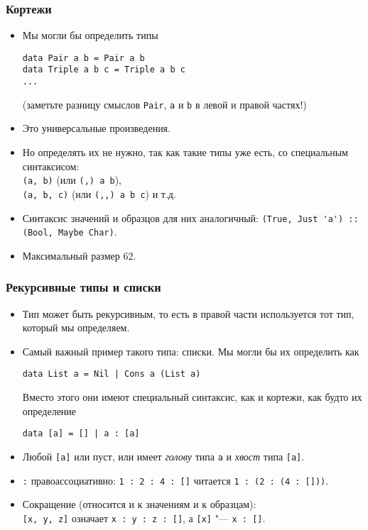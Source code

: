 \documentclass[10pt]{beamer}
\begin{document}
\begin{frame}[fragile]
  \frametitle{Кортежи}
  \begin{itemize}
    \item Мы могли бы определить типы
          \begin{lstlisting}
data Pair a b = Pair a b
data Triple a b c = Triple a b c
...
\end{lstlisting}
          (заметьте разницу смыслов \lstinline|Pair|, \lstinline|a| и \lstinline|b| в левой и правой частях!)
    \item Это универсальные произведения.
          \pause
    \item Но определять их не нужно, так как такие типы уже есть, со специальным синтаксисом:\\
          \lstinline|(a, b)| (или \lstinline|(,) a b|),\\ \lstinline|(a, b, c)| (или \lstinline|(,,) a b c|) и т.д.
    \item Синтаксис значений и образцов для них аналогичный:
          \lstinline|(True, Just 'a') :: |\pause\lstinline|(Bool, Maybe Char)|.
    \item Максимальный размер 62.
  \end{itemize}
\end{frame}

\begin{frame}[fragile]
  \frametitle{Рекурсивные типы и списки}
  \begin{itemize}
    \item Тип может быть рекурсивным, то есть в правой части используется тот тип, который мы определяем.
    \item Самый важный пример такого типа: списки.
          Мы могли бы их определить как
          \begin{lstlisting}
data List a = Nil | Cons a (List a)
\end{lstlisting}
          Вместо этого они имеют специальный синтаксис, как и кортежи, как будто их определение
          \begin{lstlisting}
data [a] = [] | a : [a]
\end{lstlisting}
    \item Любой \lstinline|[a]| или пуст, или имеет \emph{голову} типа \lstinline|a| и \emph{хвост} типа \lstinline|[a]|.
    \item \lstinline|:| правоассоциативно: \lstinline|1 : 2 : 4 : []| читается \lstinline|1 : (2 : (4 : []))|.
    \item Сокращение (относится и к значениям и к образцам):\\
          \lstinline|[x, y, z]| означает \lstinline|x : y : z : []|, а \lstinline|[x]| "--- \lstinline|x : []|.
  \end{itemize}
\end{frame}
\end{document}
